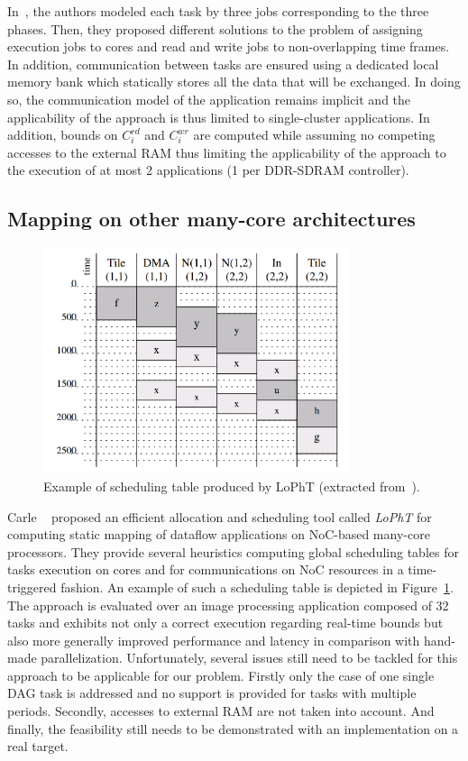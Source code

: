 \documentclass[main.tex]{subfiles}
\begin{document}
In~\cite{Becker16}, the authors modeled each task by three jobs corresponding to the three phases. Then, they proposed different solutions to the problem of assigning execution jobs to cores and read and write jobs to non-overlapping time frames. In addition, communication between tasks are ensured using a dedicated local memory bank which statically stores all the data that will be exchanged. In doing so, the communication model of the application remains implicit and the  applicability of the approach is thus limited to single-cluster applications. In addition, bounds on $C_i^{rd}$ and $C_i^{wr}$ are computed while assuming no competing accesses to the external RAM thus limiting the applicability of the approach to the execution of at most 2 applications (1 per DDR-SDRAM controller). 



\subsection{Mapping on other many-core architectures}

\begin{figure}
    \centering
    \includegraphics[width=9cm]{imgs/png/stateOfTheArt_2_LoPhTschedTable.png}
    \caption{Example of scheduling table produced by LoPhT (extracted from~\cite{Carle2014}).}
    \label{fig_stateOfTheArt_2_LoPhTschedTable}
\end{figure}

Carle \etal~\cite{Carle2014} proposed an efficient allocation and scheduling tool called \emph{LoPhT} for computing static mapping of dataflow applications on NoC-based many-core processors. They provide several heuristics computing global scheduling tables for tasks execution on cores and for communications on NoC resources in a time-triggered fashion. An example of such a scheduling table is depicted in Figure~\ref{fig_stateOfTheArt_2_LoPhTschedTable}. The approach is evaluated over an image processing application composed of 32 tasks and exhibits not only a correct execution regarding real-time bounds but also more generally improved performance and latency in comparison with hand-made parallelization. Unfortunately, several issues still need to be tackled for this approach to be applicable for our problem. Firstly only the case of one single DAG task is addressed and no support is provided for tasks with multiple periods. Secondly, accesses to external RAM are not taken into account. And finally, the feasibility still needs to be demonstrated with an implementation on a real target.\\ 
\end{document}
